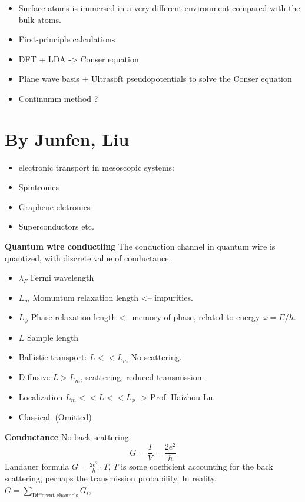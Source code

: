 \documentclass{article}
\numberwithin{equation}{subsection} %
\theoremstyle{definition}
\begin{document}
\begin{itemize}
        \item Surface atoms is immersed in a very different environment
                compared with the bulk atoms.
        \item First-principle calculations
        \item DFT + LDA -> Conser equation
        \item Plane wave basis + Ultrasoft pseudopotentials to solve the
                Conser equation
        \item Continumm method ?
\end{itemize}

\section{By Junfen, Liu}
\begin{itemize}
        \item electronic transport in mesoscopic systems:
        \item Spintronics
        \item Graphene eletronics
        \item Superconductors etc.
\end{itemize}
\textbf{Quantum wire conductiing}
The conduction channel in quantum wire is quantized, with discrete value
of conductance.
\begin{itemize}
        \item $\lambda_F$ Fermi wavelength
        \item $L_m$ Momuntum relaxation length <-- impurities.
        \item $L_\phi$ Phase relaxation length <-- memory of phase,
                related to energy $\omega = E/\hbar$.
        \item $L$ Sample length
\end{itemize}
\begin{itemize}
        \item Ballistic transport: $L << L_m$ No scattering.
        \item Diffusive $L>L_m$, scattering, reduced transmission.
        \item Localization $L_m<<L<<L_\phi$ -> Prof. Haizhou Lu.
        \item Classical. (Omitted)
\end{itemize}
\textbf{Conductance}
No back-scattering $$ G = \frac{I}{V} = \frac{2e^2}{h}$$
Landauer formula $G = \frac{2e^2}{h}\cdot T$, $T$ is some coefficient
accounting for the back scattering, perhaps the transmission
probability.
In reality, $G=\sum_{\text{Different channels}}G_i$, 
\end{document}
